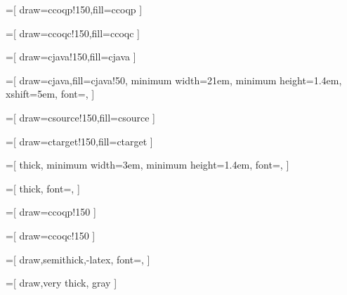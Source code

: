 

=[
 draw=ccoqp!150,fill=ccoqp
]

=[
 draw=ccoqc!150,fill=ccoqc
]

=[
 draw=cjava!150,fill=cjava
]

=[
 draw=cjava,fill=cjava!50,
 minimum width=21em,
 minimum height=1.4em,
 xshift=5em,
 font=\scriptsize\sffamily,
]

=[
 draw=csource!150,fill=csource
]

=[
 draw=ctarget!150,fill=ctarget
]

=[
 thick,
 minimum width=3em,
 minimum height=1.4em,
 font=\scriptsize\sffamily,
]

=[
 thick,
 font=\scriptsize\sffamily,
]

=[
 draw=ccoqp!150
]

=[
 draw=ccoqc!150
]

=[
 draw,semithick,-latex,
 font=\scriptsize\sffamily,
]

=[
 draw,very thick, gray
]

\newcommand{\tikzoptim}[3][]{
   \path[trans, draw=#1!150, fill=#1!150] (#2) edge [looseness=10, loop above, draw=#1!150]
       node [pos=0.5](#2-optim) {}
       node [yshift = 0.5em,below] {\href{#3}{\phantom{XXX}} \\ \href{#3}{\phantom{XXX}}} ();
}
\newcommand{\tikzloop}[4][]{
   \path[trans, draw=#1!150, fill=#1!150] (#2) edge [looseness=10, loop above, draw=#1!150]
       node [pos=0.5](#2-optim) {#4}
       node [yshift = 0.5em,below] {\href{#3}{\phantom{XXX}} \\ \href{#3}{\phantom{XXX}}} ();
}
\newcommand{\tikzoptimdashed}[3][]{
   \path[trans, draw=#1!150, fill=#1!150] (#2) edge [looseness=10, loop above, dashed, draw=#1!150]
       node [pos=0.5](#2-optim) {}
       node [yshift = 0.5em,below] {\href{#3}{\phantom{XXX}} \\ \href{#3}{\phantom{XXX}}} ();
}

